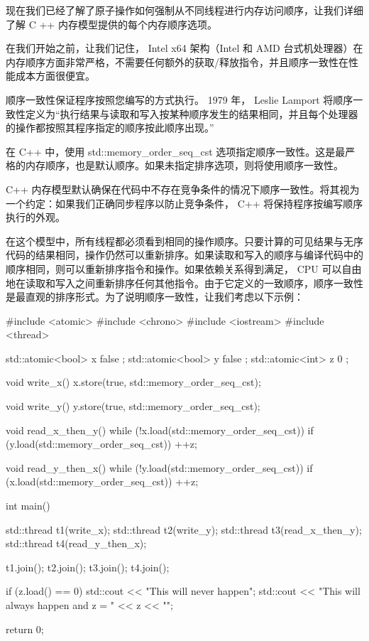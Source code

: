 现在我们已经了解了原子操作如何强制从不同线程进行内存访问顺序，让我们详细了解 C ++ 内存模型提供的每个内存顺序选项。

在我们开始之前，让我们记住， Intel x64 架构（Intel 和 AMD 台式机处理器）在内存顺序方面非常严格，不需要任何额外的获取/释放指令，并且顺序一致性在性能成本方面很便宜。


顺序一致性保证程序按照您编写的方式执行。 1979 年， Leslie Lamport 将顺序一致性定义为“执行结果与读取和写入按某种顺序发生的结果相同，并且每个处理器的操作都按照其程序指定的顺序按此顺序出现。”

在 C++ 中，使用 std::memory\_order\_seq\_cst 选项指定顺序一致性。这是最严格的内存顺序，也是默认顺序。如果未指定排序选项，则将使用顺序一致性。

C++ 内存模型默认确保在代码中不存在竞争条件的情况下顺序一致性。将其视为一个约定：如果我们正确同步程序以防止竞争条件， C++ 将保持程序按编写顺序执行的外观。

在这个模型中，所有线程都必须看到相同的操作顺序。只要计算的可见结果与无序代码的结果相同，操作仍然可以重新排序。如果读取和写入的顺序与编译代码中的顺序相同，则可以重新排序指令和操作。如果依赖关系得到满足， CPU 可以自由地在读取和写入之间重新排序任何其他指令。由于它定义的一致顺序，顺序一致性是最直观的排序形式。为了说明顺序一致性，让我们考虑以下示例：

\begin{cpp}
#include <atomic>
#include <chrono>
#include <iostream>
#include <thread>

std::atomic<bool> x{ false };
std::atomic<bool> y{ false };
std::atomic<int> z{ 0 };

void write_x() {
    x.store(true, std::memory_order_seq_cst);
}

void write_y() {
    y.store(true, std::memory_order_seq_cst);
}

void read_x_then_y() {
    while (!x.load(std::memory_order_seq_cst)) {}
    if (y.load(std::memory_order_seq_cst)) {
        ++z;
    }
}

void read_y_then_x()
{
    while (!y.load(std::memory_order_seq_cst)) {}
    if (x.load(std::memory_order_seq_cst)) {
        ++z;
    }
}

int main() {
    std::thread t1(write_x);
    std::thread t2(write_y);
    std::thread t3(read_x_then_y);
    std::thread t4(read_y_then_x);

    t1.join();
    t2.join();
    t3.join();
    t4.join();

    if (z.load() == 0) {
        std::cout << "This will never happen\n";
    }
    {
        std::cout << "This will always happen and z = " << z << "\n";
    }

    return 0;
}
\end{cpp}

